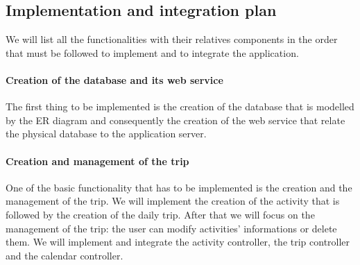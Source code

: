 \documentclass[12pt,titlepage]{article}
\begin{document}
\subsection{Implementation and integration plan}
We will list all the functionalities with their relatives components in the order that must be followed to implement and to integrate the application.
\paragraph{Creation of the database and its web service}
The first thing to be implemented is the creation of the database that is modelled by the ER diagram and consequently the creation of the web service that relate the physical database to the application server.
\begin{figure}[H]
\centering
{}
\end{figure}
\paragraph{Creation and management of the trip}
One of the basic functionality that has to be implemented is the creation and the management of the trip. We will implement the creation of the activity that is followed by the creation of the daily trip. After that we will focus on the management of the trip: the user can modify activities' informations or delete them.
We will implement and integrate the activity controller, the trip controller and the calendar controller.
\begin{figure}[H]
\centering
{}
\end{figure}
\end{document}
